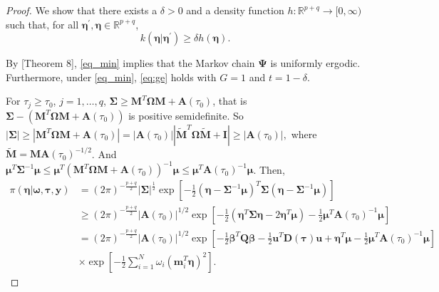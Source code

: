 \documentclass[11pt,a4paper]{article}
\begin{document}
\begin{proof}
We show that there exists a $\delta>0$ and a density function $h: \mathbb{R}^{p+q} \rightarrow [0,\infty)$ such that, for all $\bm{\eta}^{\prime}, \bm{\eta} \in \mathbb{R}^{p+q}$,
\begin{equation}
\label{eq_min}
k(\bm{\eta}|\bm{\eta}^{\prime}) \geq \delta h(\bm{\eta}).
\end{equation}

By \cite{roberts2004general}[Theorem 8], \eqref{eq_min} implies that the Markov chain $\bm{\Psi}$ is uniformly ergodic. Furthermore, under \eqref{eq_min}, \eqref{eq:ge} holds with $G=1$ and $t=1-\delta$.


For $\tau_j \geq \tau_0$, $j=1,\dots, q$, $\bm{\Sigma}\geq \bm{M}^{T}\bm{\Omega}\bm{M}+\bm{A}\left(\tau_{0}\right)$, that is $\bm{\Sigma} - (\bm{M}^{T}\bm{\Omega}\bm{M}+\bm{A}\left(\tau_{0}\right))$ is positive semidefinite. So
$\left|\bm{\Sigma}\right|\geq\left|\bm{M}^{T}\bm{\Omega}\bm{M}+\bm{A}\left(\tau_{0}\right)\right|=\left|\bm{A}\left(\tau_{0}\right)\right|\left|\tilde{\bm{M}}^{T}\bm{\Omega}\tilde{\bm{M}}+\bm{I}\right|\geq\left|\bm{A}\left(\tau_{0}\right)\right|,$
where $\tilde{\bm{M}}=\bm{M}\bm{A}\left(\tau_{0}\right)^{-1/2}$. And $
\bm{\mu}^{T}\bm{\Sigma}^{-1}\bm{\mu} \leq\bm{\mu}^{T}\left(\bm{M}^{T}\bm{\Omega}\bm{M}+\bm{A}\left(\tau_{0}\right)\right)^{-1}\bm{\mu} \leq\bm{\mu}^{T}\bm{A}\left(\tau_{0}\right)^{-1}\bm{\mu}$. Then, 
\begin{align*}
\pi(\bm{\eta}|\bm{\omega},\bm{\tau},\bm{y}) & =\left(2\pi\right)^{-\frac{p+q}{2}}\left|\bm{\Sigma}\right|^{\frac{1}{2}}\exp\left[-\frac{1}{2}\left(\bm{\eta}-\bm{\Sigma}^{-1}\bm{\mu}\right)^{T}\bm{\Sigma}\left(\bm{\eta}-\bm{\Sigma}^{-1}\bm{\mu}\right)\right]\\
& \geq\left(2\pi\right)^{-\frac{p+q}{2}}\left|\bm{A}\left(\tau_{0}\right)\right|^{1/2}\exp\left[-\frac{1}{2}\left(\bm{\eta}^{T}\bm{\Sigma}\bm{\eta}-2\bm{\eta}^{T}\bm{\mu}\right)-\frac{1}{2}\bm{\mu}^{T}\bm{A}\left(\tau_{0}\right)^{-1}\bm{\mu}\right]\\
& =\left(2\pi\right)^{-\frac{p+q}{2}}\left|\bm{A}\left(\tau_{0}\right)\right|^{1/2}\exp\left[-\frac{1}{2}\bm{\beta}^{T}\bm{Q}\bm{\beta}-\frac{1}{2}\bm{u}^{T}\bm{D}(\bm{\tau})\bm{u}+\bm{\eta}^{T}\bm{\mu}-\frac{1}{2}\bm{\mu}^{T}\bm{A}\left(\tau_{0}\right)^{-1}\bm{\mu}\right]\\
& \times\exp\left[-\frac{1}{2}\sum_{i=1}^{N}\omega_{i}\left(\bm{m}_{i}^{T}\bm{\eta}\right)^{2}\right].
\end{align*}


\end{proof}
\end{document}
